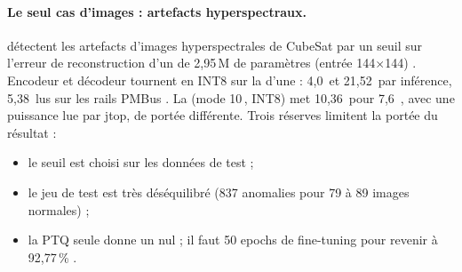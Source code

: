 \paragraph{Le seul cas d'images : artefacts hyperspectraux.}
\citet{arxiv-2407.17647-energy-efficient-artefact-detection-accelerator} détectent les
artefacts d'images hyperspectrales de CubeSat par un seuil sur l'erreur de reconstruction
d'un  de 2,95\,M de paramètres (entrée 144$\times$144) . Encodeur et
décodeur tournent en INT8 sur la   d'une  : 4,0\, et 21,52\, par
inférence, 5,38\, lus sur les rails PMBus . La 
(mode 10\,, INT8) met 10,36\, pour 7,6\, , avec une puissance lue par
jtop, de portée différente. Trois réserves limitent la portée du résultat :
\begin{itemize}
  \item le seuil est choisi sur les données de test  ;
  \item le jeu de test est très déséquilibré (837 anomalies pour 79 à 89 images normales)
     ;
  \item la PTQ seule donne un  nul ; il faut 50 epochs de fine-tuning pour revenir à
    92,77\,\% .
\end{itemize}

